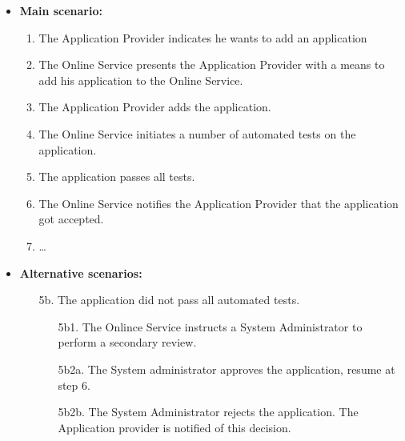 \documentclass[english]{sareport}
\begin{document}
\begin{itemize}
    \item \textbf{Main scenario:} 
    \begin{enumerate}
       \item The Application Provider indicates he wants to add an application
       \item The Online Service presents the Application Provider with a means to add his application to the Online Service.
       \item The Application Provider adds the application.
	\item The Online Service initiates a number of automated tests on the application.
	\item The application passes all tests.
	\item The Online Service notifies the Application Provider that the application got accepted.
       \item \ldots
    \end{enumerate}

    \item \textbf{Alternative scenarios:} 
    \begin{enumerate}
        \item [5b.] The application did not pass all automated tests.
	\begin{enumerate}
		\item [5b1.] The Onlince Service instructs a System Administrator to perform a secondary review.
		\item [5b2a.] The System administrator approves the application, resume at step 6.
		\item [5b2b.] The System Administrator rejects the application. The Application provider is notified of this decision.
	\end{enumerate}
    \end{enumerate}
\end{itemize}
\end{document}
